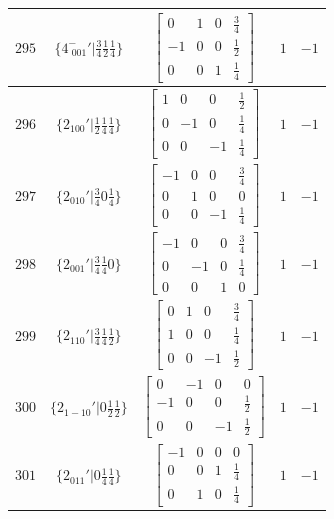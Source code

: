 \documentclass[fleqn,8pt]{jsarticle}
\begin{document}
\begin{longtable}{ccccc}
$ 295 $ & $ \{4^{-}_{\,\,001}{}'|\frac{3}{4} \frac{1}{2} \frac{1}{4}\} $ & $ \begin{bmatrix} 0 & 1 & 0 & \frac{3}{4} \\ -1 & 0 & 0 & \frac{1}{2} \\ 0 & 0 & 1 & \frac{1}{4} \end{bmatrix} $ & $ 1 $ & $ -1 $ \\ \hline
$ 296 $ & $ \{2{}_{100}{}'|\frac{1}{2} \frac{1}{4} \frac{1}{4}\} $ & $ \begin{bmatrix} 1 & 0 & 0 & \frac{1}{2} \\ 0 & -1 & 0 & \frac{1}{4} \\ 0 & 0 & -1 & \frac{1}{4} \end{bmatrix} $ & $ 1 $ & $ -1 $ \\ \hline
$ 297 $ & $ \{2{}_{010}{}'|\frac{3}{4} 0 \frac{1}{4}\} $ & $ \begin{bmatrix} -1 & 0 & 0 & \frac{3}{4} \\ 0 & 1 & 0 & 0 \\ 0 & 0 & -1 & \frac{1}{4} \end{bmatrix} $ & $ 1 $ & $ -1 $ \\ \hline
$ 298 $ & $ \{2{}_{001}{}'|\frac{3}{4} \frac{1}{4} 0\} $ & $ \begin{bmatrix} -1 & 0 & 0 & \frac{3}{4} \\ 0 & -1 & 0 & \frac{1}{4} \\ 0 & 0 & 1 & 0 \end{bmatrix} $ & $ 1 $ & $ -1 $ \\ \hline
$ 299 $ & $ \{2{}_{110}{}'|\frac{3}{4} \frac{1}{4} \frac{1}{2}\} $ & $ \begin{bmatrix} 0 & 1 & 0 & \frac{3}{4} \\ 1 & 0 & 0 & \frac{1}{4} \\ 0 & 0 & -1 & \frac{1}{2} \end{bmatrix} $ & $ 1 $ & $ -1 $ \\ \hline
$ 300 $ & $ \{2{}_{1-10}{}'|0 \frac{1}{2} \frac{1}{2}\} $ & $ \begin{bmatrix} 0 & -1 & 0 & 0 \\ -1 & 0 & 0 & \frac{1}{2} \\ 0 & 0 & -1 & \frac{1}{2} \end{bmatrix} $ & $ 1 $ & $ -1 $ \\ \hline
$ 301 $ & $ \{2{}_{011}{}'|0 \frac{1}{4} \frac{1}{4}\} $ & $ \begin{bmatrix} -1 & 0 & 0 & 0 \\ 0 & 0 & 1 & \frac{1}{4} \\ 0 & 1 & 0 & \frac{1}{4} \end{bmatrix} $ & $ 1 $ & $ -1 $ \\ \hline

\end{longtable}
\end{document}
